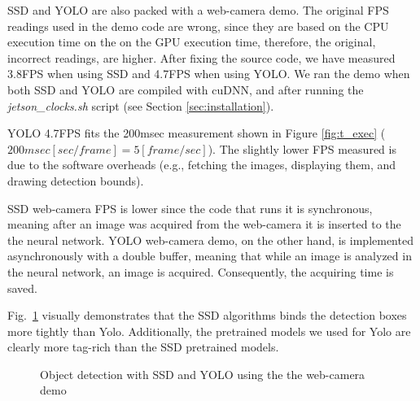 SSD and YOLO are also packed with a web-camera demo. The original FPS readings used in the demo code are wrong, since they are based on the CPU execution time on the on the GPU execution time, therefore, the original, incorrect readings, are higher. After fixing the source code, we have measured 3.8FPS when using SSD and 4.7FPS when using YOLO. We ran the demo when both SSD and YOLO are compiled with cuDNN, and after running the \textit{jetson\_clocks.sh} script (see Section \ref{sec:installation}).

YOLO 4.7FPS fits the 200msec measurement shown in Figure \ref{fig:t_exec} ($200msec [sec/frame] = 5[frame/sec]$). The slightly lower FPS measured is due to the software overheads (e.g., fetching the images, displaying them, and drawing detection bounds).

SSD web-camera FPS is lower since the code that runs it is synchronous, meaning after an image was acquired from the web-camera it is inserted to the the neural network. YOLO web-camera demo, on the other hand, is implemented asynchronously with a double buffer, meaning that while an image is analyzed in the neural network, an image is acquired. Consequently, the acquiring time is saved. 

Fig.~\ref{fig:cam} visually demonstrates that the SSD algorithms binds the detection boxes more tightly than Yolo. Additionally, the pretrained models we used for Yolo are clearly more tag-rich than the SSD pretrained models.

\begin{figure}[h]
	\caption{Object detection with SSD and YOLO using the the web-camera demo}
	\label{fig:cam}
\end{figure}